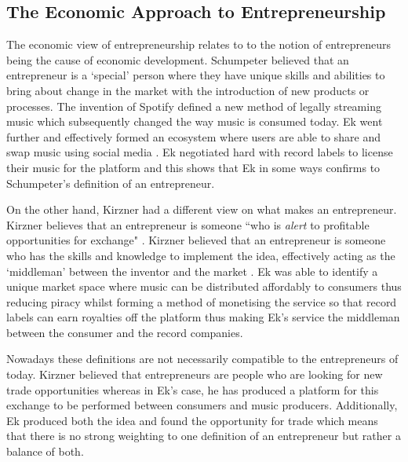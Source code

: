 \subsection{The Economic Approach to Entrepreneurship}
The economic view of entrepreneurship relates to to the notion of entrepreneurs being the cause of economic development. Schumpeter believed that an entrepreneur is a `special' person \parencite[][9]{deakins2012} where they have unique skills and abilities to bring about change in the market with the introduction of new products or processes. The invention of Spotify defined a new method of legally streaming music which subsequently changed the way music is consumed today. Ek went further and effectively formed an ecosystem where users are able to share and swap music using social media \parencite{dyer2013}. Ek negotiated hard with record labels to license their music for the platform \parencite{lynskey2013} and this shows that Ek in some ways confirms to Schumpeter's definition of an entrepreneur.
\par
On the other hand, Kirzner had a different view on what makes an entrepreneur. Kirzner believes that an entrepreneur is someone  ``who is \emph{alert} to profitable opportunities for exchange" \parencite[][8]{deakins2012}. Kirzner believed that an entrepreneur is someone who has the skills and knowledge to implement the idea, effectively acting as the `middleman' between the inventor and the market \parencite[][8]{deakins2012}. Ek was able to identify a unique market space where music can be distributed affordably to consumers thus reducing piracy whilst forming a method of monetising the service so that record labels can earn royalties off the platform \parencite{bertoni2012} thus making Ek's service the middleman between the consumer and the record companies.
\par
Nowadays these definitions are not necessarily compatible to the entrepreneurs of today. Kirzner believed that entrepreneurs are people who are looking for new trade opportunities whereas in Ek's case, he has produced a platform for this exchange to be performed between consumers and music producers. Additionally, Ek produced both the idea and found the opportunity for trade which means that there is no strong weighting to one definition of an entrepreneur but rather a balance of both. 

